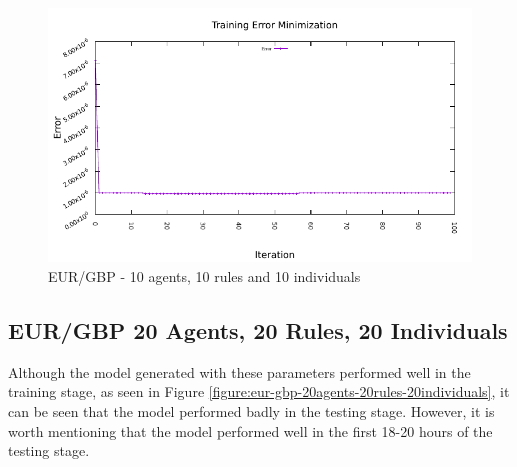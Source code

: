 \begin{figure}[htp]
  \medskip

  \includegraphics[width=.45\textwidth]{img/plots/eur_gbp_h1-10agents-10rules-10ind-100gen_error_minimization.pdf}

  \caption{EUR/GBP - 10 agents, 10 rules and 10 individuals}
  \label{figure:eur-gbp-10agents-10rules-10individuals}
\end{figure}

\newpage

\subsection{EUR/GBP 20 Agents, 20 Rules, 20 Individuals}
\label{results:forecast-eur-gbp-20agents-20rules-20individuals}

Although the model generated with these parameters performed well in the
training stage, as seen in Figure
\ref{figure:eur-gbp-20agents-20rules-20individuals}, it can be seen that the
model performed badly in the testing stage. However, it is worth mentioning that
the model performed well in the first 18-20 hours of the testing stage.

